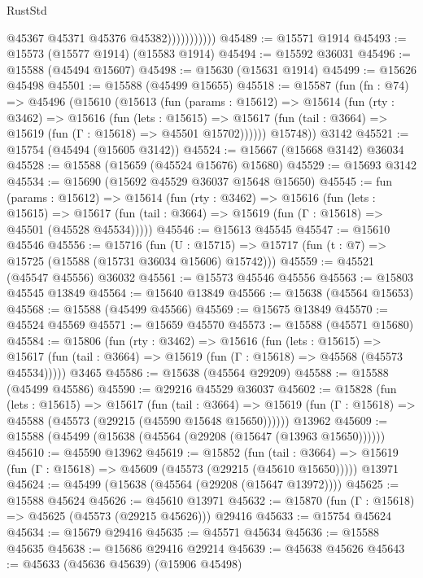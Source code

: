 \begin{lexlean}{RustStd}
\begin{coremodule}
                          @45367
                          @45371
                          @45376
                          @45382)))))))))))
@45489 := @15571 @1914
@45493 := @15573 (@15577 @1914) (@15583 @1914)
@45494 := @15592 @36031
@45496 := @15588 (@45494 @15607)
@45498 := @15630 (@15631 @1914)
@45499 := @15626 @45498
@45501 := @15588 (@45499 @15655)
@45518 := @15587
    (fun (fn : @74) =>
    @45496
      (@15610
        (@15613
          (fun (params : @15612) =>
          @15614
            (fun (rty : @3462) =>
            @15616
              (fun (lets : @15615) =>
              @15617 (fun (tail : @3664) => @15619 (fun (Γ : @15618) => @45501 @15702))))))
        @15748))
    @3142
@45521 := @15754 (@45494 (@15605 @3142))
@45524 := @15667 (@15668 @3142) @36034
@45528 := @15588 (@15659 (@45524 @15676) @15680)
@45529 := @15693 @3142
@45534 := @15690 (@15692 @45529 @36037 @15648 @15650)
@45545 := fun (params : @15612) =>
  @15614
    (fun (rty : @3462) =>
    @15616
      (fun (lets : @15615) =>
      @15617 (fun (tail : @3664) => @15619 (fun (Γ : @15618) => @45501 (@45528 @45534)))))
@45546 := @15613 @45545
@45547 := @15610 @45546
@45556 := @15716
    (fun (U : @15715) => @15717 (fun (t : @7) => @15725 (@15588 (@15731 @36034 @15606) @15742)))
@45559 := @45521 (@45547 @45556) @36032
@45561 := @15573 @45546 @45556
@45563 := @15803 @45545 @13849
@45564 := @15640 @13849
@45566 := @15638 (@45564 @15653)
@45568 := @15588 (@45499 @45566)
@45569 := @15675 @13849
@45570 := @45524 @45569
@45571 := @15659 @45570
@45573 := @15588 (@45571 @15680)
@45584 := @15806
    (fun (rty : @3462) =>
    @15616
      (fun (lets : @15615) =>
      @15617 (fun (tail : @3664) => @15619 (fun (Γ : @15618) => @45568 (@45573 @45534)))))
    @3465
@45586 := @15638 (@45564 @29209)
@45588 := @15588 (@45499 @45586)
@45590 := @29216 @45529 @36037
@45602 := @15828
    (fun (lets : @15615) =>
    @15617
      (fun (tail : @3664) =>
      @15619 (fun (Γ : @15618) => @45588 (@45573 (@29215 (@45590 @15648 @15650))))))
    @13962
@45609 := @15588 (@45499 (@15638 (@45564 (@29208 (@15647 (@13963 @15650))))))
@45610 := @45590 @13962
@45619 := @15852
    (fun (tail : @3664) => @15619 (fun (Γ : @15618) => @45609 (@45573 (@29215 (@45610 @15650)))))
    @13971
@45624 := @45499 (@15638 (@45564 (@29208 (@15647 @13972))))
@45625 := @15588 @45624
@45626 := @45610 @13971
@45632 := @15870 (fun (Γ : @15618) => @45625 (@45573 (@29215 @45626))) @29416
@45633 := @15754 @45624
@45634 := @15679 @29416
@45635 := @45571 @45634
@45636 := @15588 @45635
@45638 := @15686 @29416 @29214
@45639 := @45638 @45626
@45643 := @45633 (@45636 @45639) (@15906 @45498)

\end{coremodule}
\end{lexlean}

